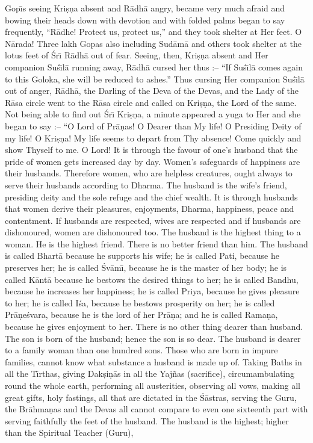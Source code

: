 Gop\={\i}s seeing Kri\d{s}\d{n}a absent and R\=adh\=a angry, became very much afraid and bowing their heads down with devotion and with folded palms began to say frequently, ``R\=adhe! Protect us, protect us,'' and they took shelter at Her feet. O N\=arada! Three lakh Gopas also including Sud\=am\=a and others took shelter at the lotus feet of \'Sr\={\i} R\=adh\=a out of fear. Seeing, then, Kri\d{s}\d{n}a absent and Her companion Su\'s\={\i}l\=a running away, R\=adh\=a cursed her thus :-- ``If Su\'s\={\i}l\=a comes again to this Goloka, she will be reduced to ashes.'' Thus cursing Her companion Su\'s\={\i}l\=a out of anger, R\=adh\=a, the Darling of the Deva of the Devas, and the Lady of the R\=asa circle went to the R\=asa circle and called on Kri\d{s}\d{n}a, the Lord of the same. Not being able to find out \'Sr\={\i} Kri\d{s}\d{n}a, a minute appeared a yuga to Her and she began to say :-- ``O Lord of Pr\=a\d{n}as! O Dearer than My life! O Presiding Deity of my life! O Kri\d{s}\d{n}a! My life seems to depart from Thy absence! Come quickly and show Thyself to me. O Lord! It is through the favour of one's husband that the pride of women gets increased day by day. Women's safeguards of happiness are their husbands. Therefore women, who are helpless creatures, ought always to serve their husbands according to Dharma. The husband is the wife's friend, presiding deity and the sole refuge and the chief wealth. It is through husbands that women derive their pleasures, enjoyments, Dharma, happiness, peace and contentment. If husbands are respected, wives are respected and if husbands are dishonoured, women are dishonoured too. The husband is the highest thing to a woman. He is the highest friend. There is no better friend than him. The husband is called Bhart\=a because he supports his wife; he is called Pati, because he preserves her; he is called \'Sv\=am\={\i}, because he is the master of her body; he is called K\=ant\=a because he bestows the desired things to her; he is called Bandhu, because he increases her happiness; he is called Priya, because he gives pleasure to her; he is called I\'sa, because he bestows prosperity on her; he is called Pr\=a\d{n}e\'svara, because he is the lord of her Pr\=a\d{n}a; and he is called Rama\d{n}a, because he gives enjoyment to her. There is no other thing dearer than husband. The son is born of the husband; hence the son is so dear. The husband is dearer to a family woman than one hundred sons. Those who are born in impure families, cannot know what substance a husband is made up of. Taking Baths in all the T\={\i}rthas, giving Dak\d{s}i\d{n}\=as in all the Yaj\~nas (sacrifice), circumambulating round the whole earth, performing all austerities, observing all vows, making all great gifts, holy fastings, all that are dictated in the \'S\=astras, serving the Guru, the Br\=ahma\d{n}as and the Devas all cannot compare to even one sixteenth part with serving faithfully the feet of the husband. The husband is the highest; higher than the Spiritual Teacher (Guru),

